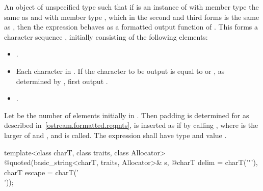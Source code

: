 \begin{itemdescr}
\pnum
\returns An object of unspecified type such that if  is an instance
of  with member type  the same as
 and with member type , which in the second and third
forms is the same as , then the expression
behaves as a formatted output function
of . This forms a character sequence , initially
consisting of the following elements:
\begin{itemize}
\item {}.
\item Each character in . If the character to be output is equal to
 or , as determined by , first
output .
\item {}.
\end{itemize}
Let  be the number of elements initially in .
Then padding is determined for  as described
in~\ref{ostream.formatted.reqmts},  is inserted as if by calling
, where  is the larger of
 and , and  is called.
The expression  shall have type
 and value .
\end{itemdescr}

%
\begin{itemdecl}
template<class charT, class traits, class Allocator>
  @\unspec@ quoted(basic_string<charT, traits, Allocator>& s,
  @\itcorr@                   charT delim = charT('"'), charT escape = charT('\\'));
\end{itemdecl}


